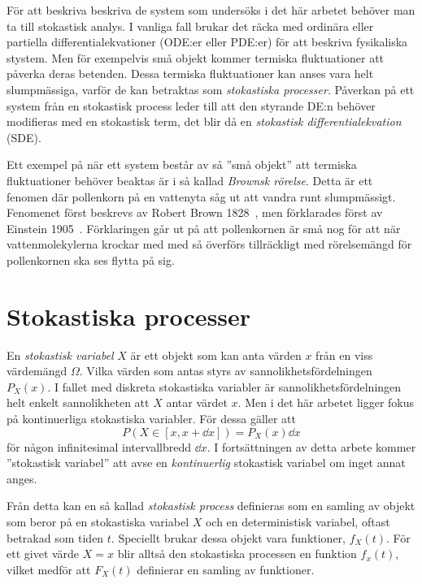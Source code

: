 
För att beskriva beskriva de system som undersöks i det här arbetet
behöver man ta till stokastisk analys. I vanliga fall brukar
det räcka med ordinära eller partiella differential\-ekvationer (ODE:er
eller PDE:er) för att beskriva fysikaliska stystem. Men för exempelvis
små objekt kommer termiska fluktuationer att påverka deras
betenden. Dessa termiska fluktuationer kan anses vara helt
slumpmässiga, varför de kan betraktas som \emph{stokastiska
  processer}. Påverkan på ett system från en stokastisk process leder
till att den styrande DE:n behöver modifieras med en stokastisk term,
det blir då en \emph{stokastisk differentialekvation} (SDE).

Ett exempel på när ett system består av så ''små objekt'' att termiska
fluktuationer behöver beaktas är i så kallad \emph{Brownsk
  rörelse}. Detta är ett fenomen där pollenkorn på en vattenyta såg ut
att vandra runt slumpmässigt. Fenomenet först beskrevs av Robert Brown
1828~\cite{Brown1828}, men förklarades först av Einstein
1905~\cite{Einstein1905}. Förklaringen går ut på att pollenkornen är
små nog för att när vattenmolekylerna krockar med med så överförs
tillräckligt med rörelsemängd för pollenkornen ska ses flytta på sig. 

\section{Stokastiska processer}
En \emph{stokastisk variabel} $X$ är ett objekt som kan anta värden
$x$ från en viss värdemängd $\Omega$. Vilka värden som antas styrs av
sannolikhetsfördelningen $P_X(x)$. I fallet med diskreta stokastiska
variabler är sannolikhetsfördelningen helt enkelt sannolikheten att
$X$ antar värdet $x$. Men i det här arbetet ligger fokus på
kontinuerliga stokastiska variabler. För dessa gäller att 
\begin{equation}
P(X\in[x, x+\dd{x}]) =P_X(x)\dd{x}
\end{equation}
för någon infinitesimal intervallbredd $\dd{x}$. 
I fortsättningen av detta arbete kommer ''stokastisk variabel'' att
avse en \emph{kontinuerlig} stokastisk variabel om inget annat anges.


Från detta kan en så kallad \emph{stokastisk process} definieras som en
samling av objekt som beror på en stokastiska variabel $X$ och en
deterministisk variabel, oftast betrakad som tiden\footnotemark{}
$t$. Speciellt brukar dessa objekt vara 
funktioner, $f_X(t)$. För ett givet värde $X=x$ blir alltså den
stokastiska processen en funktion $f_x(t)$, vilket medför att $F_X(t)$
definierar en samling av funktioner. 

